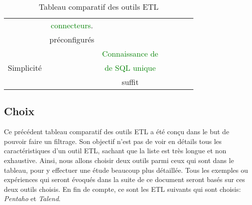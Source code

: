 \documentclass[12pt,a4wide,twoside]{report}
\begin{document}
\begin{table}[h]
\begin{center}
\begin{tabular}{|l|c|c|c|c|c|c|}
					& \textcolor{green}{connecteurs}. &  &  &  &  &  \\
					&préconfigurés&  &  &  &  &  \\
					\hline
					\multirow{3}{2cm}{Simplicité} &&\textcolor{green}{Connaissance de}&&&&\\
					& & \textcolor{green}{de SQL unique}& &  &  &  \\
					&& suffit&  &  &  &  \\
					\hline
					
					\end{tabular}
			\end{center}
			\caption{Tableau comparatif des outils ETL}
			\end{table}
			
							\subsection{Choix}
			Ce précédent tableau comparatif des outils ETL a été conçu dans le but de pouvoir faire un filtrage. Son objectif n'est pas de voir en détails tous les caractéristiques d'un outil ETL, sachant que la liste est très longue et non exhaustive. Ainsi, nous allons choisir deux outils parmi ceux qui sont dans le tableau, pour y effectuer une étude beaucoup plus détaillée. Tous les exemples ou expériences qui seront évoqués dans la suite de ce document seront basés sur ces deux outils choisis.\newline
			 En fin de compte, ce sont les ETL suivants qui sont choisis: \emph{Pentaho} et \emph{Talend}.
\end{document}
